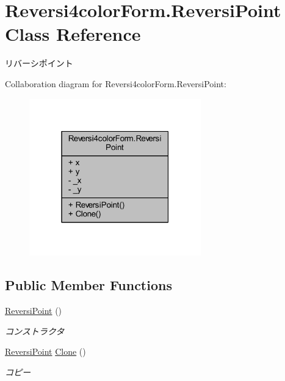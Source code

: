 \hypertarget{class_reversi4color_form_1_1_reversi_point}{}\section{Reversi4color\+Form.\+Reversi\+Point Class Reference}
\label{class_reversi4color_form_1_1_reversi_point}


リバーシポイント  




Collaboration diagram for Reversi4color\+Form.\+Reversi\+Point\+:\nopagebreak
\begin{figure}[H]
\begin{center}
\leavevmode
\includegraphics[width=211pt]{class_reversi4color_form_1_1_reversi_point__coll__graph}
\end{center}
\end{figure}
\subsection*{Public Member Functions}
\begin{DoxyCompactItemize}
\item 
\hyperlink{class_reversi4color_form_1_1_reversi_point_a27174c0214cc9516f398f70a768d00fe}{Reversi\+Point} ()
\begin{DoxyCompactList}\small\item\em コンストラクタ \end{DoxyCompactList}\item 
\hyperlink{class_reversi4color_form_1_1_reversi_point}{Reversi\+Point} \hyperlink{class_reversi4color_form_1_1_reversi_point_a2f9e4db4dd43e27f9c957e5a221ca6f2}{Clone} ()
\begin{DoxyCompactList}\small\item\em コピー \end{DoxyCompactList}\end{DoxyCompactItemize}
